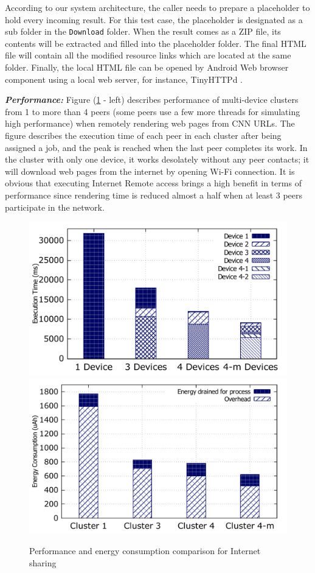 \documentclass{sig-alternate}[10pt]
\begin{document}
According to our system architecture, the caller needs to prepare a placeholder to hold every incoming result. For this test case, the placeholder is designated as a sub folder in the \texttt{Download} folder. When the result comes as a ZIP file, its contents will be extracted and filled into the placeholder folder. The final HTML file will contain all the modified resource links which are located at the same folder. Finally, the local HTML file can be opened by Android Web browser component using a local web server, for instance, TinyHTTPd \cite{tinyhttpd}.

\textbf{\emph{Performance:}}
Figure (\ref{fig:net_clusters_perf} - left) describes performance of multi-device clusters from 1 to more than 4 peers (some peers use a few more threads for simulating high performance) when remotely rendering web pages from CNN URLs. The figure describes the execution time of each peer in each cluster after being assigned a job, and the peak is reached when the last peer completes its work. In the cluster with only one device, it works desolately without any peer contacts; it will download web pages from the internet by opening Wi-Fi connection. It is obvious that executing Internet Remote access brings a high benefit in terms of performance since rendering time is reduced almost a half when at least 3 peers participate in the network. 

\begin{figure}
	\centering
		\includegraphics[width=.45\textwidth]{data/net_perf_01.pdf}
		\includegraphics[width=.45\textwidth]{data/net_energy.pdf}
	\caption{Performance and energy consumption comparison for Internet sharing}
	\label{fig:net_clusters_perf}
\end{figure}
\end{document}
